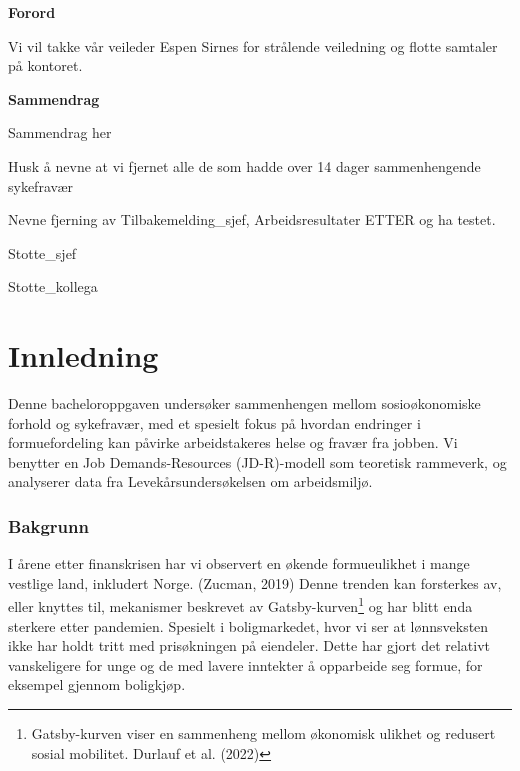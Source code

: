 \documentclass[
  12pt,
  a4paper,
  DIV=11,
  numbers=noendperiod]{scrartcl}
\renewcommand*\contentsname{Table of contents}
\newcommand\contentsname{Table of contents}
\begin{document}




\thispagestyle{plain}
\begin{center}
    \Large
    \textbf{Forord}
\end{center}

Vi vil takke vår veileder Espen Sirnes for strålende veiledning og
flotte samtaler på kontoret.

\newpage
\hypersetup{linkcolor=black}
\renewcommand{\contentsname}{Innholdsfortegnelse}
\renewcommand*{\figureautorefname}{Figur}
\renewcommand*{\tableautorefname}{Tabell}
\renewcommand*{\equationautorefname}{Ligning}
\renewcommand*{\sectionautorefname}{Kapittel}
\renewcommand*{\subsectionautorefname}{Underkapittel}
\renewcommand*{\subsubsectionautorefname}{Delkapittel}
\tableofcontents
\listoffigures
\listoftables
\hypersetup{linkcolor=blue}
\newpage
\thispagestyle{plain}
\begin{center}
    \Large
    \textbf{Sammendrag}
\end{center}

Sammendrag her

Husk å nevne at vi fjernet alle de som hadde over 14 dager
sammenhengende sykefravær

Nevne fjerning av Tilbakemelding\_sjef, Arbeidsresultater ETTER og ha
testet.

Stotte\_sjef

Stotte\_kollega

\newpage

\section{Innledning}\label{innledning}

Denne bacheloroppgaven undersøker sammenhengen mellom sosioøkonomiske
forhold og sykefravær, med et spesielt fokus på hvordan endringer i
formuefordeling kan påvirke arbeidstakeres helse og fravær fra jobben.
Vi benytter en Job Demands-Resources (JD-R)-modell som teoretisk
rammeverk, og analyserer data fra Levekårsundersøkelsen om arbeidsmiljø.

\subsubsection{Bakgrunn}\label{bakgrunn}

I årene etter finanskrisen har vi observert en økende formueulikhet i
mange vestlige land, inkludert Norge. (Zucman, 2019) Denne trenden kan
forsterkes av, eller knyttes til, mekanismer beskrevet av
Gatsby-kurven\footnote{Gatsby-kurven viser en sammenheng mellom
  økonomisk ulikhet og redusert sosial mobilitet. Durlauf et al. (2022)}
og har blitt enda sterkere etter pandemien. Spesielt i boligmarkedet,
hvor vi ser at lønnsveksten ikke har holdt tritt med prisøkningen på
eiendeler. Dette har gjort det relativt vanskeligere for unge og de med
lavere inntekter å opparbeide seg formue, for eksempel gjennom
boligkjøp.
\end{document}
